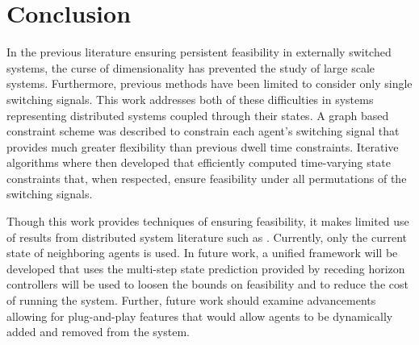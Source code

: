 \section{Conclusion}
In the previous literature ensuring persistent feasibility in externally switched systems, the curse of dimensionality has prevented the study of large scale systems. Furthermore, previous methods have been limited to consider only single switching signals. This work addresses both of these difficulties in systems representing distributed systems coupled through their states. A graph based constraint scheme was described to constrain each agent's switching signal that provides much greater flexibility than previous dwell time constraints. Iterative algorithms where then developed that efficiently computed time-varying state constraints that, when respected, ensure feasibility under all permutations of the switching signals. 

Though this work provides techniques of ensuring feasibility, it makes limited use of results from distributed system literature such as \cite{Monasterios2019}. Currently, only the current state of neighboring agents is used. In future work, a unified framework will be developed that uses the multi-step state prediction provided by receding horizon controllers will be used to loosen the bounds on feasibility and to reduce the cost of running the system. Further, future work should examine advancements allowing for plug-and-play features that would allow agents to be dynamically added and removed from the system. 